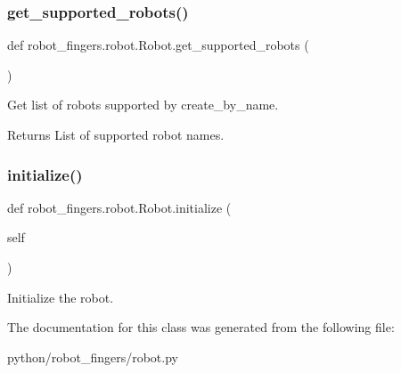 \subsubsection{\texorpdfstring{get\+\_\+supported\+\_\+robots()}{get\_supported\_robots()}}
{\footnotesize\ttfamily def robot\+\_\+fingers.\+robot.\+Robot.\+get\+\_\+supported\+\_\+robots (\begin{DoxyParamCaption}{ }\end{DoxyParamCaption})\hspace{0.3cm}{\ttfamily [static]}}



Get list of robots supported by {\ttfamily create\+\_\+by\+\_\+name}. 

\begin{DoxyReturn}{Returns}
List of supported robot names. 
\end{DoxyReturn}
\mbox{\label{classrobot__fingers_1_1robot_1_1Robot_a68fd76fde66f13b697e2492932b2dca5}} 
\subsubsection{\texorpdfstring{initialize()}{initialize()}}
{\footnotesize\ttfamily def robot\+\_\+fingers.\+robot.\+Robot.\+initialize (\begin{DoxyParamCaption}\item[{}]{self }\end{DoxyParamCaption})}



Initialize the robot. 



The documentation for this class was generated from the following file\+:\begin{DoxyCompactItemize}
\item 
python/robot\+\_\+fingers/robot.\+py\end{DoxyCompactItemize}
